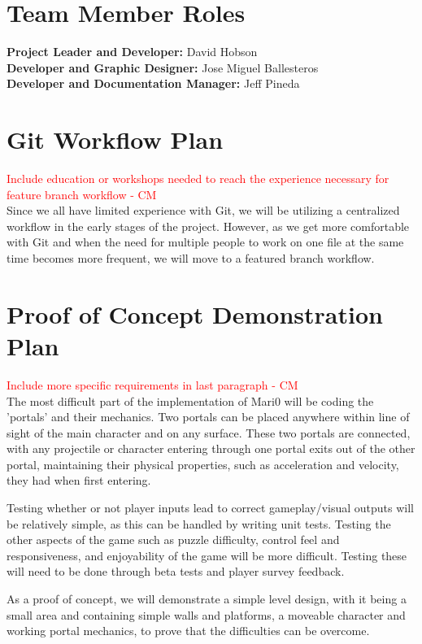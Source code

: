\documentclass{article}
\begin{document}
\section{Team Member Roles}
\textbf{Project Leader and Developer:}  David Hobson\\
\textbf{Developer and Graphic Designer:}  Jose Miguel Ballesteros\\
\textbf{Developer and Documentation Manager:}  Jeff Pineda\\

\section{Git Workflow Plan}
\textcolor{red}{Include education or workshops needed to reach the experience necessary for feature branch workflow - CM} \\
Since we all have limited experience with Git, we will be utilizing a centralized workflow in the early stages of the project. However, as we get more comfortable with Git and when the need for multiple people to work on one file at the same time becomes more frequent, we will move to a featured branch workflow.
\section{Proof of Concept Demonstration Plan}
\textcolor{red}{Include more specific requirements in last paragraph - CM} \\
The most difficult part of the implementation of Mari0 will be coding the 'portals' and their mechanics. Two portals can be placed anywhere within line of sight of the main character and on any surface. These two portals are connected, with any projectile or character entering through one portal exits out of the other portal, maintaining their physical properties, such as acceleration and velocity, they had when first entering.

Testing whether or not player inputs lead to correct gameplay/visual outputs will be relatively simple, as this can be handled by writing unit tests. Testing the other aspects of the game such as puzzle difficulty, control feel and responsiveness, and enjoyability of the game will be more difficult. Testing these will need to be done through beta tests and player survey feedback.

As a proof of concept, we will demonstrate a simple level design, with it being a small area and containing simple walls and platforms, a moveable character and working portal mechanics, to prove that the difficulties can be overcome.
\end{document}
